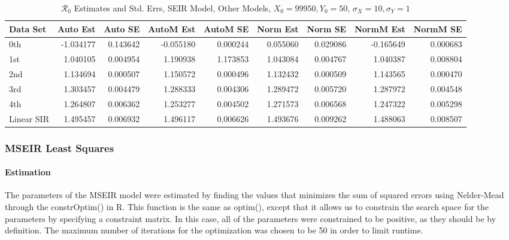 \documentclass[12pt]{article}
\newcommand{\rr}{\ensuremath{\mathcal{R}_0}}
\begin{document}
\begin{table}[H]
	
	\caption{$\rr$ Estimates and Std. Errs, SEIR Model,
		Other Models, $X_0 = 99950, Y_0 = 50$, 
		$\sigma_X = 10, \sigma_Y = 1$}
	\begin{footnotesize}
		\hskip -1cm
		\begin{tabular}{l|r|r|r|r|r|r|r|r}
			\hline
			Data Set & Auto Est & Auto SE & AutoM Est & AutoM SE & Norm Est & Norm SE & NormM Est & NormM SE\\
			\hline
			0th & -1.034177 & 0.143642 & -0.055180 & 0.000244 & 0.055060 & 0.029086 & -0.165649 & 0.000683\\
			\hline
			1st & 1.040105 & 0.004954 & 1.190938 & 1.173853 & 1.043084 & 0.004767 & 1.040387 & 0.008804\\
			\hline
			2nd & 1.134694 & 0.000507 & 1.150572 & 0.000496 & 1.132432 & 0.000509 & 1.143565 & 0.000470\\
			\hline
			3rd & 1.303457 & 0.004479 & 1.288333 & 0.004306 & 1.289472 & 0.005720 & 1.287972 & 0.004548\\
			\hline
			4th & 1.264807 & 0.006362 & 1.253277 & 0.004502 & 1.271573 & 0.006568 & 1.247322 & 0.005298\\
			\hline
			Linear SIR & 1.495457 & 0.006932 & 1.496117 & 0.006626 & 1.493676 & 0.009262 & 1.488063 & 0.008507\\
			\hline
		\end{tabular}
	\end{footnotesize}
\end{table}

\subsubsection{MSEIR Least Squares}

\paragraph{Estimation}

The parameters of the MSEIR model were estimated by finding the values that minimizes the sum of squared errors using Nelder-Mead through the constrOptim() in R. This function is the same as optim(), except that it allows us to constrain the search space for the parameters by specifying a constraint matrix. In this case, all of the parameters were constrained to be positive, as they should be by definition. The maximum number of iterations for the optimization was chosen to be 50 in order to limit runtime. 
\end{document}
